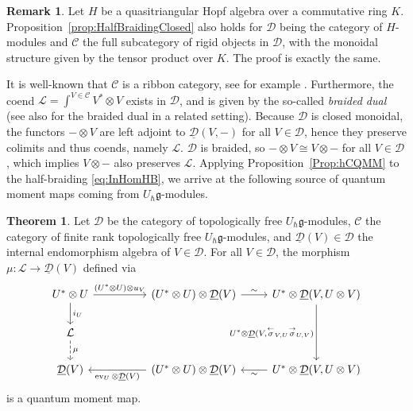 \documentclass[12pt,dvipsnames]{article}
\numberwithin{equation}{section}
\theoremstyle{definition}
\newtheorem{remark}[definition]{Remark}
\newtheorem{theorem}[definition]{Theorem}
\newcommand{\cat}[1]{\mathcal{#1}}
\newcommand{\1}{\ensuremath{\mathbbm{1}}}
\DeclareMathOperator{\ev}{ev}
\newcommand{\lc}{\ensuremath{\overset{\rightarrow}{\sigma}}}
\newcommand{\rc}{\ensuremath{\overset{\leftarrow}{\sigma}}}
\newcommand{\blank}{{-}}
\begin{document}
\begin{remark}
    Let $H$ be a quasitriangular Hopf algebra over a commutative ring $K$. Proposition~\ref{prop:HalfBraidingClosed} also holds for $\cat{D}$ being the category of $H$-modules and $\cat{C}$ the full subcategory of 
    rigid objects in $\cat{D}$, with the monoidal structure given by the tensor product over $K$. The proof is exactly the same.
\end{remark}

It is well-known that $\cat{C}$ is a ribbon category, see for example \cite[Sec.\,XVII.3]{Ka95}. Furthermore, the coend $\mathcal{L} = \int^{V\in\cat{C}}V^\ast\otimes V$ exists in $\cat{D}$, and is given by the so-called \emph{braided dual} \cite[p.\,26]{Ke23} (see also \cite[Sec.\,6]{BBJ15} for the braided dual in a related setting). Because $\cat{D}$ is closed monoidal, the functors $\blank\otimes V$ are left adjoint to $\underline{\cat{D}}(V,\blank)$ for all $V\in\cat{D}$, hence they preserve colimits and thus coends, namely $\mathcal{L}$. $\cat{D}$ is braided, so $\blank\otimes V\cong V\otimes\blank$ for all $V\in\cat{D}$, which implies $V\otimes\blank$ also preserves $\cat{L}$. Applying Proposition~\ref{Prop:hCQMM} to the half-braiding \eqref{eq:InHomHB}, we arrive at the following source of quantum moment maps coming from $U_\hbar\mathfrak{g}$-modules.
\begin{theorem}\label{thm:QMMHmod}
    Let $\cat{D}$ be the category of topologically free $U_\hbar\mathfrak{g}$-modules, $\cat{C}$ the category of finite rank topologically free $U_\hbar\mathfrak{g}$-modules, and $\underline{\cat{D}}(V)\in\cat{D}$ the internal endomorphism algebra of $V\in\cat{D}$. For all $V\in\cat{D}$, the morphism $\mu:\mathcal{L}\to\underline{\cat{D}}(V)$ defined via
    \begin{equation}
        \begin{tikzcd}
            U^\ast\otimes U && (U^\ast\otimes U)\otimes\underline{\cat{D}}(V) & U^\ast\otimes\underline{\cat{D}}(V,U\otimes V) \\
            \mathcal{L} &&&\\
            \underline{\cat{D}}(V) && (U^\ast\otimes U)\otimes\underline{\cat{D}}(V) & U^\ast\otimes\underline{\cat{D}}(V,U\otimes V)
            \arrow["(U^\ast\otimes U)\otimes u_V", from=1-1, to=1-3]\arrow["\sim", from=1-3, to=1-4]\arrow["{U^\ast\otimes\underline{\cat{D}}(V,\rc_{V,U}\lc_{U,V})}"', from=1-4, to=3-4]\arrow["\sim", from=3-4, to=3-3]\arrow["{\ev_U\otimes\underline{\cat{D}}(V)}", from=3-3, to=3-1]
            \arrow["i_U", from=1-1, to=2-1]\arrow[dashed, "\mu", from=2-1, to=3-1]
        \end{tikzcd}
    \end{equation}
    is a quantum moment map.
\end{theorem}
\end{document}
